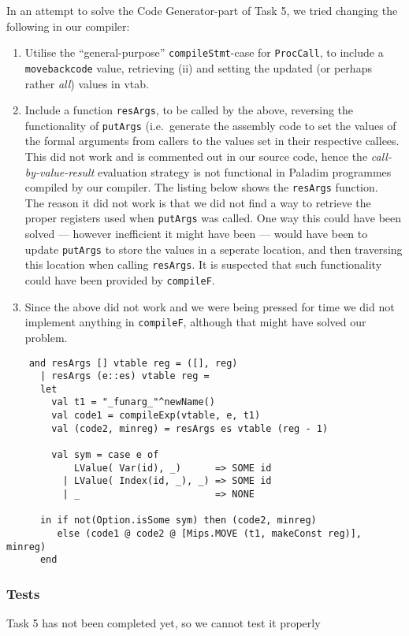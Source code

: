 \documentclass[11pt]{article}
\begin{document}
In an attempt to solve the Code Generator-part of Task 5, we tried changing the
following in our compiler:
\begin{enumerate}[i]
    \item Utilise the ``general-purpose'' {\tt compileStmt}-case for {\tt ProcCall},
          to include a {\tt movebackcode} value, retrieving (ii) and
          setting the updated (or perhaps rather {\it all}\/) values in vtab.
    \item Include a function {\tt resArgs}, to be called by the above, reversing
          the functionality of {\tt putArgs} (i.e.\ generate the assembly code to
          set the values of the formal arguments from callers to the values set
          in their respective callees.\\
          This did not work and is commented out in our source code, hence the
          {\it call-by-value-result}\/ evaluation strategy is not functional in
          Paladim programmes compiled by our compiler. The listing below shows
          the {\tt resArgs} function.\\
          The reason it did not work is that we did not find a way to retrieve
          the proper registers used when {\tt putArgs} was called. One way this
          could have been solved --- however inefficient it might have been ---
          would have been to update {\tt putArgs} to store the values in a
          seperate location, and then traversing this location when calling
          {\tt resArgs}. It is suspected that such functionality could have
          been provided by {\tt compileF}.
    \item Since the above did not work and we were being pressed for time
          we did not implement anything in {\tt compileF}, although that might
          have solved our problem.
\end{enumerate} 

\begin{lstlisting}
    and resArgs [] vtable reg = ([], reg)
      | resArgs (e::es) vtable reg =
      let
        val t1 = "_funarg_"^newName()
        val code1 = compileExp(vtable, e, t1)
        val (code2, minreg) = resArgs es vtable (reg - 1)

        val sym = case e of 
            LValue( Var(id), _)      => SOME id
          | LValue( Index(id, _), _) => SOME id
          | _                        => NONE
      
      in if not(Option.isSome sym) then (code2, minreg)
         else (code1 @ code2 @ [Mips.MOVE (t1, makeConst reg)], minreg)
      end
\end{lstlisting}

\subsubsection*{Tests}
Task 5 has not been completed yet, so we cannot test it properly 
\end{document}
